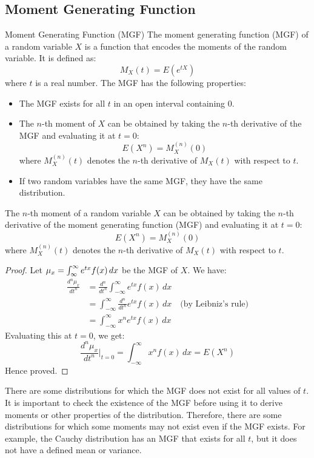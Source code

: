 \documentclass[openany]{book}
\begin{document}
\subsection{Moment Generating Function}
\begin{mydefinition}{Moment Generating Function (MGF)}
    The moment generating function (MGF) of a random variable $X$ is a function that encodes the moments of the random variable. It is defined as:
    $$M_X(t) = E(e^{tX})$$
    where $t$ is a real number. The MGF has the following properties:
    \begin{itemize}
        \item The MGF exists for all $t$ in an open interval containing 0.
        \item The $n$-th moment of $X$ can be obtained by taking the $n$-th derivative of the MGF and evaluating it at $t = 0$:
        $$E(X^n) = M_X^{(n)}(0)$$
        where $M_X^{(n)}(t)$ denotes the $n$-th derivative of $M_X(t)$ with respect to $t$.
        \item If two random variables have the same MGF, they have the same distribution.
    \end{itemize}
\end{mydefinition}
\begin{mytheorem}
    The $n$-th moment of a random variable $X$ can be obtained by taking the $n$-th derivative of the moment generating function (MGF) and evaluating it at $t = 0$:
    $$E(X^n) = M_X^{(n)}(0)$$
    where $M_X^{(n)}(t)$ denotes the $n$-th derivative of $M_X(t)$ with respect to $t$.
\end{mytheorem}
\begin{proof}
    Let $\mu_x = \int_{\-\infty}^{\infty}e^{tx}f(x) \, dx$ be the MGF of $X$. We have:
    \begin{align*}
        \frac{d^n \mu_x}{dt^n} &= \frac{d^n}{dt^n} \int_{-\infty}^{\infty} e^{tx} f(x) \, dx \\
        &= \int_{-\infty}^{\infty} \frac{d^n}{dt^n} e^{tx} f(x) \, dx \quad \text{(by Leibniz's rule)} \\
        &= \int_{-\infty}^{\infty} x^n e^{tx} f(x) \, dx
    \end{align*}
    Evaluating this at $t = 0$, we get:
    $$\frac{d^n \mu_x}{dt^n} \bigg|_{t=0} = \int_{-\infty}^{\infty} x^n f(x) \, dx = E(X^n)$$
    Hence proved.
\end{proof}
\begin{mynote}
There are some distributions for which the MGF does not exist for all values of $t$. It is important to check the existence of the MGF before using it to derive moments or other properties of the distribution. Therefore, there are some distributions for which some moments may not exist even if the MGF exists. For example, the Cauchy distribution has an MGF that exists for all $t$, but it does not have a defined mean or variance.
\end{mynote}
\end{document}
